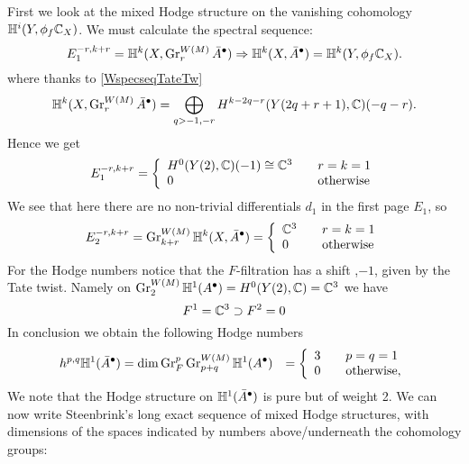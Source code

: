 \documentclass[../main.tex]{subfiles}
\begin{document}
\begin{es}
First we look at the mixed Hodge structure on the vanishing cohomology  $\mathbb{H}^i(Y,\phi_f \mathbb{C}_X)$. We must calculate the spectral sequence:
\begin{equation}
\label{vanishingspecseq}
E^{-r,k+r}_1=\mathbb{H}^{k}(X,\operatorname{Gr}^{W(M)}_{r}\bar A^\bullet) \Rightarrow \mathbb{H}^{k}(X,\bar A^\bullet)=\mathbb{H}^k(Y,\phi_f \mathbb{C}_X).
\end{equation}
where thanks to \eqref{WspecseqTateTw}
\begin{align}
\mathbb{H}^{k}(X,\operatorname{Gr}^{W(M)}_{r}\bar A^\bullet)=\bigoplus_{q>-1,-r} H^{k-2q-r}( Y({2q+r+1}),\mathbb{C})(-q-r).  \label{Wspecseqfirstpage}
\end{align}
Hence we get
\[
 {E_1^{-r,k+r}}=  
    \left\{\begin{array}{ll} 
  H^0(Y(2),\mathbb{C})(-1) \cong \mathbb{C}^3 &\quad r = k = 1 \\
0 &\quad \text{otherwise}  \end{array}\right.
\]
We see that here there are no non-trivial differentials $d_1$ in the first page $E_1$, so 
\[
 {E_2^{-r,k+r}}= \operatorname{Gr}^{W(M)}_{k+r} \mathbb{H}^k(X,\bar A^\bullet)=
    \left\{\begin{array}{ll} 
  \mathbb{C}^3 &\quad r = k = 1 \\
0 &\quad \text{otherwise}  \end{array}\right.
\]
For the Hodge numbers notice that the $F$-filtration has a shift ,$-1$, given by the Tate twist. Namely on $\operatorname{Gr}_2^{W(M)} \mathbb{H}^1(A^\bullet) = H^0(Y(2),\mathbb{C})=\mathbb{C}^3$ we have
\[
F^1 = \mathbb{C}^3 \supset F^2=0
\]
In conclusion we obtain the following Hodge numbers
\begin{eqnarray*}h^{p,q}\mathbb{H}^1(\bar A^\bullet)&= \dim \operatorname{Gr}^p_F \operatorname{Gr}^{W(M)}_{p+q} \mathbb{H}^1(A^\bullet)   &=\left\{\begin{array}{ll} 3 &\quad p=q=1\\ 0&\quad\hbox{otherwise,}\end{array}\right.\\
\end{eqnarray*}
We note that the Hodge structure on $\mathbb{H}^1(\bar A^\bullet)$ is pure but of weight 2.
We can now write Steenbrink's long exact sequence of mixed Hodge structures, with dimensions of the spaces indicated by numbers above/underneath the cohomology groups:

\vspace{5mm}

\end{es}
\end{document}
